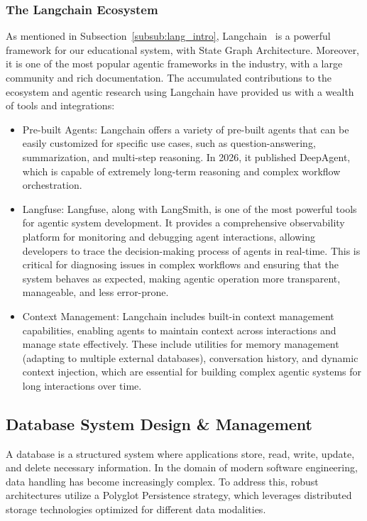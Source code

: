 \subsubsection*{The Langchain Ecosystem}
As mentioned in Subsection~\ref{subsub:lang_intro}, Langchain~\cite{LangChain} is a powerful framework for our educational system, with State Graph Architecture. Moreover, it is one of the most popular agentic frameworks in the industry, with a large community and rich documentation. The accumulated contributions to the ecosystem and agentic research using Langchain have provided us with a wealth of tools and integrations:
\begin{itemize}
    \item {Pre-built Agents:} Langchain offers a variety of pre-built agents that can be easily customized for specific use cases, such as question-answering, summarization, and multi-step reasoning. In 2026, it published DeepAgent, which is capable of extremely long-term reasoning and complex workflow orchestration.
    \item {Langfuse:} Langfuse, along with LangSmith, is one of the most powerful tools for agentic system development. It provides a comprehensive observability platform for monitoring and debugging agent interactions, allowing developers to trace the decision-making process of agents in real-time. This is critical for diagnosing issues in complex workflows and ensuring that the system behaves as expected, making agentic operation more transparent, manageable, and less error-prone. 
    \item {Context Management:} Langchain includes built-in context management capabilities, enabling agents to maintain context across interactions and manage state effectively. These include utilities for memory management (adapting to multiple external databases), conversation history, and dynamic context injection, which are essential for building complex agentic systems for long interactions over time.
\end{itemize}




\subsection{Database System Design \& Management}
A database is a structured system where applications store, read, write, update, and delete necessary information. In the domain of modern software engineering, data handling has become increasingly complex. To address this, robust architectures utilize a Polyglot Persistence strategy, which leverages distributed storage technologies optimized for different data modalities.

